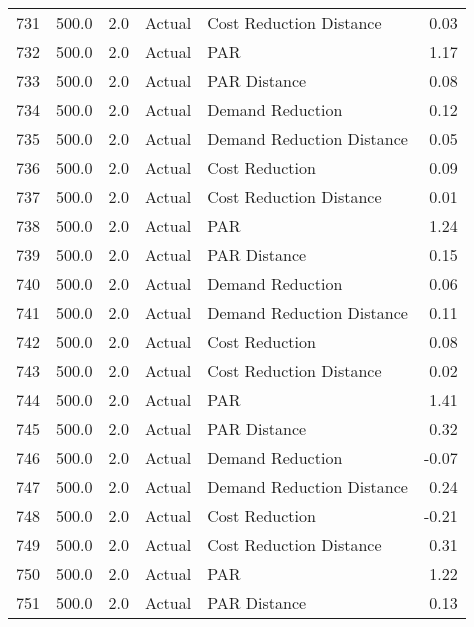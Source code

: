 \begin{longtable}{lrrllr}
731  &        500.0 &     2.0 &         Actual &    Cost Reduction Distance &   0.03 \\
732  &        500.0 &     2.0 &         Actual &                        PAR &   1.17 \\
733  &        500.0 &     2.0 &         Actual &               PAR Distance &   0.08 \\
734  &        500.0 &     2.0 &         Actual &           Demand Reduction &   0.12 \\
735  &        500.0 &     2.0 &         Actual &  Demand Reduction Distance &   0.05 \\
736  &        500.0 &     2.0 &         Actual &             Cost Reduction &   0.09 \\
737  &        500.0 &     2.0 &         Actual &    Cost Reduction Distance &   0.01 \\
738  &        500.0 &     2.0 &         Actual &                        PAR &   1.24 \\
739  &        500.0 &     2.0 &         Actual &               PAR Distance &   0.15 \\
740  &        500.0 &     2.0 &         Actual &           Demand Reduction &   0.06 \\
741  &        500.0 &     2.0 &         Actual &  Demand Reduction Distance &   0.11 \\
742  &        500.0 &     2.0 &         Actual &             Cost Reduction &   0.08 \\
743  &        500.0 &     2.0 &         Actual &    Cost Reduction Distance &   0.02 \\
744  &        500.0 &     2.0 &         Actual &                        PAR &   1.41 \\
745  &        500.0 &     2.0 &         Actual &               PAR Distance &   0.32 \\
746  &        500.0 &     2.0 &         Actual &           Demand Reduction &  -0.07 \\
747  &        500.0 &     2.0 &         Actual &  Demand Reduction Distance &   0.24 \\
748  &        500.0 &     2.0 &         Actual &             Cost Reduction &  -0.21 \\
749  &        500.0 &     2.0 &         Actual &    Cost Reduction Distance &   0.31 \\
750  &        500.0 &     2.0 &         Actual &                        PAR &   1.22 \\
751  &        500.0 &     2.0 &         Actual &               PAR Distance &   0.13 \\

\end{longtable}
